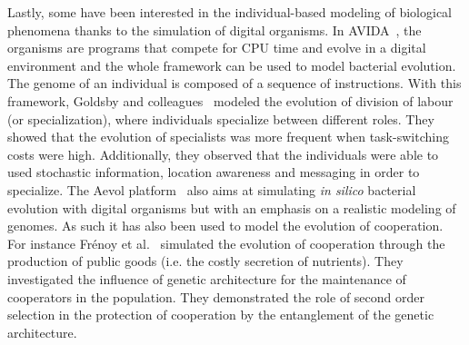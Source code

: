     Lastly, some have been interested in the individual-based modeling of biological phenomena thanks to the simulation of digital organisms. In AVIDA~\parencite{Lenski1999}, the organisms are programs that compete for CPU time and evolve in a digital environment and the whole framework can be used to model bacterial evolution. The genome of an individual is composed of a sequence of instructions. With this framework, Goldsby and colleagues~\parencite{Goldsby2012} modeled the evolution of division of labour (or specialization), where individuals specialize between different roles. They showed that the evolution of specialists was more frequent when task-switching costs were high. Additionally, they observed that the individuals were able to used stochastic information, location awareness and messaging in order to specialize. The Aevol platform~\parencite{Knibbe2005, Batut2013} also aims at simulating \emph{in silico} bacterial evolution with digital organisms but with an emphasis on a realistic modeling of genomes. As such it has also been used to model the evolution of cooperation. For instance Fr\'{e}noy et al.~\parencite{Frenoy2013} simulated the evolution of cooperation through the production of public goods (i.e. the costly secretion of nutrients). They investigated the influence of genetic architecture for the maintenance of cooperators in the population. They demonstrated the role of second order selection in the protection of cooperation by the entanglement of the genetic architecture.




